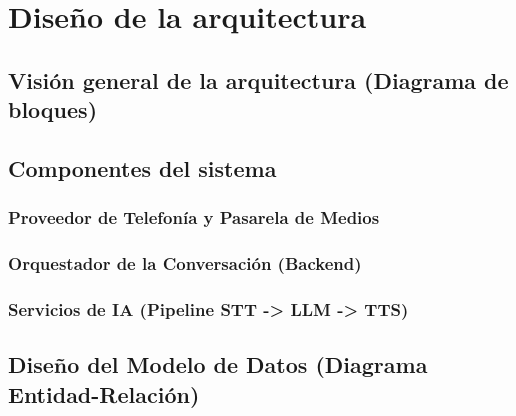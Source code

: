 \chapter{\textbf{Diseño de la arquitectura}}
\label{ch:Arquitectura}
\thispagestyle{fancy}

\section{Visión general de la arquitectura (Diagrama de bloques)}
\label{sec:vision_general_arquitectura}

\textoBase


\section{Componentes del sistema}
\label{sec:componentes_sistema}

\textoBase

\subsection{Proveedor de Telefonía y Pasarela de Medios}
\label{subsec:proveedor_telefonia}

\textoBaseAlt

\subsection{Orquestador de la Conversación (Backend)}
\label{subsec:orquestador_backend}

\textoBase

\subsection{Servicios de IA (Pipeline STT -> LLM -> TTS)}
\label{subsec:servicios_ia}

\textoBaseAlt


\section{Diseño del Modelo de Datos (Diagrama Entidad-Relación)}
\label{sec:modelo_datos}

\textoBase

